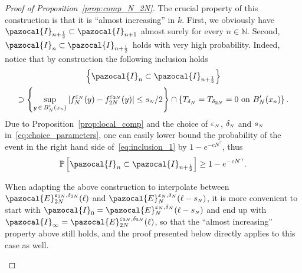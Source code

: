 \documentclass[AHL,Unicode,longabstracts,published]{cedram}
\renewcommand{\P}{\mathbb{P}}
\newcommand{\N}{\mathbb{N}}
\newcommand{\si}[1]{{\mathchoice{}{}{\scriptscriptstyle}{}#1}}
\newcommand{\sN}{{\mathchoice{}{}{\scriptscriptstyle}{}N}}
\begin{document}
\begin{proof}[Proof of Proposition~\ref{prop:comp_N_2N}]
The crucial property of this construction is that it is ``almost increasing'' in $k$. First, we obviously have $\pazocal{I}_{n+\frac12}\subset \pazocal{I}_{n+1}$ almost surely for every $n\in\N$. Second, $\pazocal{I}_{n}\subset \pazocal{I}_{n+\frac12}$ holds with very high probability. Indeed, notice that by construction the following inclusion holds
\begin{multline}\label{eq:inclusion_1}
\left\{\pazocal{I}_{n}\subset \pazocal{I}_{n+\frac12}\right\}\\
\supset \left\{\sup_{y\,\in\,B'_N(x_n)} \left|f_N^{\varepsilon_N}(y)-f_{2N}^{\varepsilon_{2N}}(y)\right|\leq s_{\sN}/2\right\} \cap \left\{T_{\delta_{N}} = T_{\delta_{2N}} = 0 \text{ on } B'_N(x_n)\right\}.
\end{multline}
Due to Proposition~\ref{prop:local_comp} and the choice of $\varepsilon_{\sN}$, $\delta_{\sN}$ and $s_{\sN}$ in~\eqref{eq:choice_parameters}, one can easily lower bound the probability of the event in the right hand side of~\eqref{eq:inclusion_1} by $1-e^{-cN^\gamma}$, thus
\begin{equation}\label{eq:n_n+1/2}
\P\left[\pazocal{I}_{n}\subset \pazocal{I}_{n+\frac12}\right]\geq 1-e^{-cN^\gamma}.
\end{equation}

\begin{rema}\label{rmk:interpolation}
When adapting the above construction to interpolate between $\pazocal{E}_{2N}^{\varepsilon_{\si{2N}}, \delta_{\si{2N}}}(\ell)$ and $\pazocal{E}_{N}^{\varepsilon_{\sN},\delta_{\sN}}(\ell-s_{\sN})$, it is more convenient to start with $\pazocal{I}_0=\pazocal{E}_{N}^{\varepsilon_{\sN}, \delta_{\sN}}(\ell-s_{\sN})$ and end up with $\pazocal{I}_{\infty}=\pazocal{E}_{2N}^{\varepsilon_{\si{2N}}, \delta_{\si{2N}}}(\ell)$, so that the ``almost increasing'' property above still holds, and the proof presented below directly applies to this case as well.
\end{rema}



\end{proof}
\end{document}
